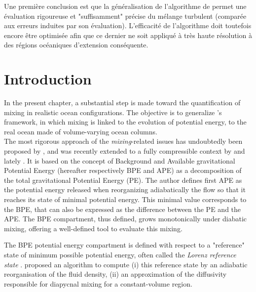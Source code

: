 Une première conclusion est que la généralisation de l'algorithme de \cite{winters_available_1995} permet une évaluation rigoureuse et "suffisamment" précise du mélange turbulent (comparée aux erreurs induites par son évaluation). L'efficacité de l'algorithme doit toutefois encore être optimisée afin que ce dernier ne soit appliqué à très haute résolution à des régions océaniques d'extension conséquente.

\section{Introduction}

In the present chapter, a substantial step is made toward the quantification of mixing in realistic ocean configurations. The objective is to generalize \citet{winters_available_1995}'s framework, in which mixing is linked to the evolution of potential energy, to the real ocean made of volume-varying ocean columns.\\

The most rigorous approach of the \textit{mixing}-related issues has undoubtedly been proposed by \cite{lorenz_available_1955}, and was recently extended to a fully compressible context by \cite{tailleux_energetics_2009} and lately \cite{tailleux_irreversible_2013}. It is based on the concept of Background and Available gravitational Potential Energy (hereafter respectively BPE and APE) as a decomposition of the total gravitational Potential Energy (PE). The author defines first APE as the potential energy released when reorganizing adiabatically the flow so that it reaches its state of minimal potential energy. This minimal value corresponds to the BPE, that can also be expressed as the difference between the PE and the APE. The BPE compartment, thus defined, grows monotonically under diabatic mixing, offering a well-defined tool to evaluate this mixing.

The BPE potential energy compartment is defined with respect to a "reference" state of minimum possible potential energy, often called the \textit{Lorenz reference state} \citep{saenz_estimating_2015}. \cite{winters_available_1995} proposed an algorithm to compute (i) this reference state by an adiabatic reorganisation of the fluid density, (ii) an approximation of the diffusivity responsible for diapycnal mixing for a constant-volume region.


